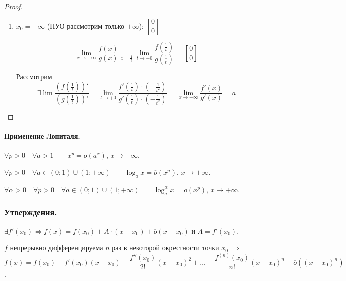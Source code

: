 \documentclass[12pt]{article}
\begin{document}
\begin{proof}
\begin{enumerate}
			$$
			\dfrac{f(x)(1 - \frac{f(x)}{f(x)})}{g(x)(1 - \frac{g(y)}{g(x)})} = \dfrac{f'(c)}{g'(c)}
			$$
			$$
			\dfrac{f(x)}{g(x)} = \dfrac{f'(c)}{g'(c)} \cdot \dfrac{1 - \frac{g(y)}{g(x)}}{1 - \frac{f(y)}{f(x)}} = \dfrac{f'(c)}{g'(c)} \cdot \left( 1 + \underbrace{\dfrac{\overbrace{\frac{f(y)}{f(x)}}^{\to 0} - \overbrace{\frac{g(y)}{g(x)}}^{\to 0}}{1 - \underbrace{\frac{f(y)}{f(x)}}_{\to 0}}}_{\text{б. м.}} \right) > \dfrac{1}{2} \cdot \dfrac{f'(c)}{g'(c)} > \dfrac{1}{2 \varepsilon} \quad \forall x \geqslant \dfrac{1}{2 \delta}
			$$
			
			\item $x_0 = \pm \infty$ (НУО рассмотрим только $+ \infty$); $\left[ \dfrac{0}{0} \right]$
			
			$$
			\lim\limits_{x \to + \infty} \dfrac{f(x)}{g(x)} \underset{x = \frac{1}{t}}{=} \lim\limits_{t \to +0} \dfrac{f(\frac{1}{t})}{g(\frac{1}{t})} = \left[ \dfrac{0}{0} \right]
			$$
			
			Рассмотрим
			$$
			\exists \lim \dfrac{(f(\frac{1}{t}))'}{(g(\frac{1}{t}))'} = \lim\limits_{t \to +0} \dfrac{f'(\frac{1}{t}) \cdot (- \frac{1}{t^2})}{g'(\frac{1}{t}) \cdot (- \frac{1}{t^2})} = \lim\limits_{x \to + \infty} \dfrac{f'(x)}{g'(x)} = a
			$$
		\end{enumerate}
	\end{proof}
	\paragraph{Применение Лопиталя.}
	\begin{lemma}
		$\forall p > 0 \quad \forall a > 1 \qquad x^p = \overline{o}(a^x)$, $x \to + \infty$.
	\end{lemma}
	\begin{lemma}
		$\forall p > 0 \quad \forall a \in (0; 1) \cup (1; + \infty) \qquad \log_a x = \overline{o}(x^p)$, $x \to + \infty$.
	\end{lemma}
	\begin{lemma}
		$\forall \alpha > 0 \quad \forall p > 0 \quad \forall a \in (0; 1) \cup (1; + \infty) \qquad \log_a^\alpha x = \overline{o}(x^p)$, $x \to + \infty$.
	\end{lemma}
	\subsubsection{Утверждения.}
	\begin{statement}
		$\exists f'(x_0) \Leftrightarrow f(x) = f(x_0) + A \cdot (x - x_0) + \overline{o} (x - x_0)$ и $A = f'(x_0)$.
	\end{statement}
	\begin{statement}
		$f$ непрерывно дифференцируема $n$ раз в некоторой окрестности точки $x_0$ $\Rightarrow$ $f(x) = f(x_0) + f'(x_0)(x - x_0) + \dfrac{f''(x_0)}{2!}(x - x_0)^2 + \dots + \dfrac{f^{(n)}(x_0)}{n!}(x - x_0)^n + \overline{o}((x - x_0)^n)$.
	\end{statement}
\end{document}
